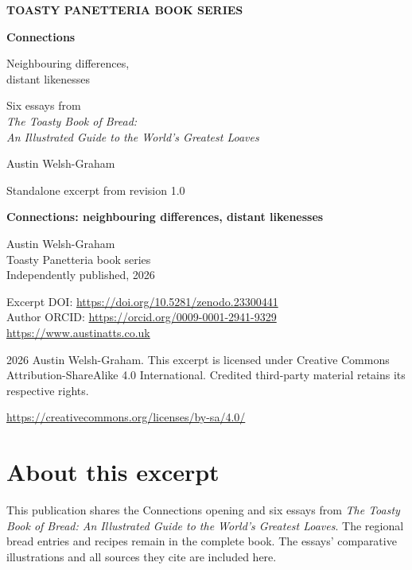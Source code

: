 \documentclass[11pt,oneside,openany]{book}
\begin{document}
\frontmatter
\atlasbooktrue
\begin{titlepage}
{\sffamily\bfseries\color{Teal}TOASTY PANETTERIA BOOK SERIES\par}
\vspace{15mm}
{\sffamily\bfseries\fontsize{31}{35}\selectfont Connections\par}
\vspace{5mm}
{\sffamily\Large Neighbouring differences,\\distant likenesses\par}
\vspace{12mm}
\vspace{12mm}
{\sffamily\large Six essays from\\\emph{The Toasty Book of Bread:}\\\emph{An Illustrated Guide to the World's Greatest Loaves}\par}
\vfill
{\sffamily\large Austin Welsh-Graham\par}
\vspace{3mm}
{\sffamily Standalone excerpt from revision 1.0\par}
\end{titlepage}
\thispagestyle{empty}
\textbf{Connections: neighbouring differences, distant likenesses}

Austin Welsh-Graham\\
Toasty Panetteria book series\\
Independently published, 2026

Excerpt DOI: \url{https://doi.org/10.5281/zenodo.23300441}\\
Author ORCID: \url{https://orcid.org/0009-0001-2941-9329}\\
\url{https://www.austinatts.co.uk}

\vspace{5mm}\licensebadge

\textcopyright{} 2026 Austin Welsh-Graham. This excerpt is licensed under Creative Commons Attribution-ShareAlike 4.0 International. Credited third-party material retains its respective rights.

\url{https://creativecommons.org/licenses/by-sa/4.0/}

\section*{About this excerpt}
This publication shares the Connections opening and six essays from \emph{The Toasty Book of Bread: An Illustrated Guide to the World's Greatest Loaves}. The regional bread entries and recipes remain in the complete book. The essays' comparative illustrations and all sources they cite are included here.
\end{document}
